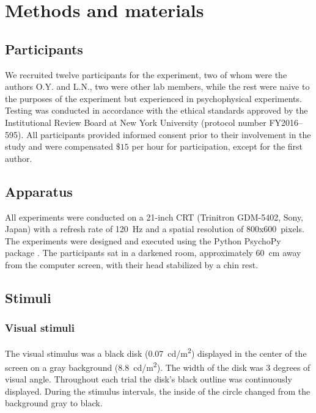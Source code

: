 \documentclass[9pt,lineno,doublespacing]{elife}
\begin{document}
\section{Methods and materials}

\subsection{Participants}
We recruited twelve participants for the experiment, two of whom were the authors O.Y. and L.N., two were other lab members, while the rest were naive to the purposes of the experiment but experienced in psychophysical experiments. 
Testing was conducted in accordance with the ethical standards approved by the Institutional Review Board at New York University (protocol number FY2016–595). 
All participants provided informed consent prior to their involvement in the study and were compensated $\$15$ per hour for participation, except for the first author.

\subsection{Apparatus}

All experiments were conducted on a 21-inch CRT (Trinitron GDM-5402, Sony, Japan) with a refresh rate of 120~Hz and a spatial resolution of 800x600~pixels. The experiments were designed and executed using the Python PsychoPy package \citep{peirce2007psychopy}. The participants sat in a darkened room, approximately 60~cm away from the computer screen, with their head stabilized by a chin rest.

\subsection{Stimuli}

\subsubsection{Visual stimuli}

The visual stimulus was a black disk (0.07~cd/m\textsuperscript{2}) displayed in the center of the screen on a gray background (8.8~cd/m\textsuperscript{2}). The width of the disk was 3 degrees of visual angle. Throughout each trial the disk's black outline was continuously displayed. During the stimulus intervals, the inside of the circle changed from the background gray to black.
\end{document}
